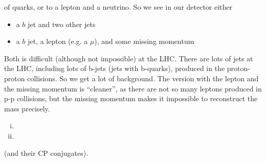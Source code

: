 \begin{enumerate}[a)]
{    of quarks, or to a lepton and a neutrino. So we see in our
    detector either
    \begin{itemize}
    \item a $b$ jet and two other jets
    \item a $b$ jet, a lepton (e.g. a $\mu$), and some missing momentum
    \end{itemize}
    Both is difficult (although not impossible) at the LHC. There are
    lots of jets at the LHC, including lots of b-jets (jets with
    b-quarks), produced in the proton-proton collisions. So we get a
    lot of background. The version with the lepton and the missing
    momentum is ``cleaner'', as there are not so many leptons produced
    in p-p collisions, but the missing momentum makes it impossible to
    reconstruct the mass precisely.  }
\end{enumerate}
\begin{enumerate}[i)]
\item {}
\item {}
\end{enumerate}
(and their CP conjugates). 
